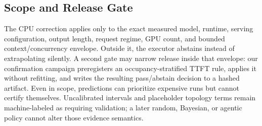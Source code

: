 \subsection{Scope and Release Gate}

The CPU correction applies only to the exact measured model, runtime, serving
configuration, output length, request regime, GPU count, and bounded
context/concurrency envelope.  Outside it, the executor abstains instead of
extrapolating silently.  A second gate may narrow release inside that envelope:
our confirmation campaign preregisters an occupancy-stratified TTFT rule,
applies it without refitting, and writes the resulting pass/abstain decision to
a hashed artifact.  Even in scope, predictions can prioritize expensive runs
but cannot certify themselves.  Uncalibrated intervals and placeholder
topology terms remain machine-labeled as requiring validation; a later random,
Bayesian, or agentic policy cannot alter those evidence semantics.
